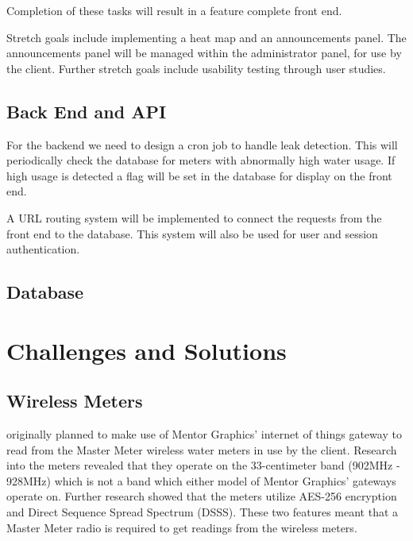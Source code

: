 \documentclass[journal]{IEEEtran}
\begin{document}
Completion of these tasks will result in a feature complete front end.

Stretch goals include implementing a heat map and an announcements panel. The announcements panel will be managed within the administrator panel, for use by the client. Further stretch goals include usability testing through user studies.


\subsection{Back End and API} \label{future:back}
For the backend we need to design a cron job to handle leak detection. This will periodically check the database for meters with abnormally high water usage. If high usage is detected a flag will be set in the database for display on the front end.

A URL routing system will be implemented to connect the requests from the front end to the database. This system will also be used for user and session authentication.

\subsection{Database}



\section{Challenges and Solutions}
\subsection{Wireless Meters}
 originally planned to make use of Mentor Graphics' internet of things gateway to read from the Master Meter wireless water meters in use by the client. Research into the meters revealed that they operate on the 33-centimeter band (902MHz - 928MHz) which is not a band which either model of Mentor Graphics' gateways operate on. Further research showed that the meters utilize AES-256 encryption and Direct Sequence Spread Spectrum (DSSS). These two features meant that a Master Meter radio is required to get readings from the wireless meters.
\end{document}

